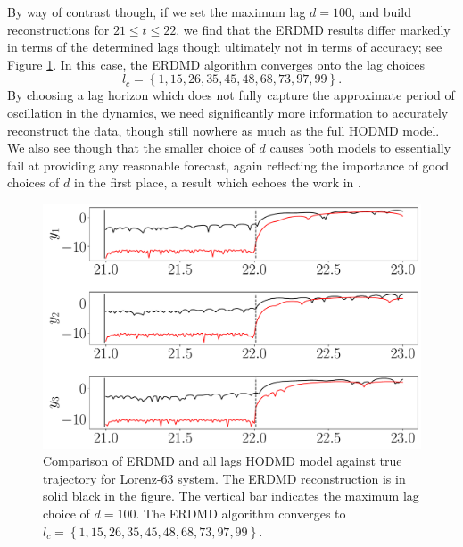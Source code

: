 \documentclass[a4paper,11pt]{article}
\begin{document}
By way of contrast though, if we set the maximum lag $d=100$, and build reconstructions for $21\leq t \leq 22$, we find that the ERDMD results differ  markedly in terms of the determined lags though ultimately not in terms of accuracy; see Figure \ref{fig:lorenz_compare_d_100}.  In this case, the ERDMD algorithm converges onto the lag choices 
$$
l_{c}=\left\{1,15, 26, 35, 45, 48, 68, 73, 97,99\right\}.
$$  
By choosing a lag horizon which does not fully capture the approximate period of oscillation in the dynamics, we need significantly more information to accurately reconstruct the data, though still nowhere as much as the full HODMD model.  We also see though that the smaller choice of $d$ causes both models to essentially fail at providing any reasonable forecast, again reflecting the importance of good choices of $d$ in the first place, a result which echoes the work in \cite{duraisamy}.
\begin{figure}[!h]
\centering
\includegraphics[width=.8\textwidth]{Lorenz_error_compare_w_mx_lag_100}
\caption{Comparison of ERDMD and all lags HODMD model against true trajectory for Lorenz-63 system.  The ERDMD reconstruction is in solid black in the figure.  The vertical bar indicates the maximum lag choice of $d=100$. The ERDMD algorithm converges to $l_{c}=\left\{1,15, 26, 35, 45, 48, 68, 73, 97,99\right\}$.}
\label{fig:lorenz_compare_d_100}
\end{figure}
 
\end{document}
